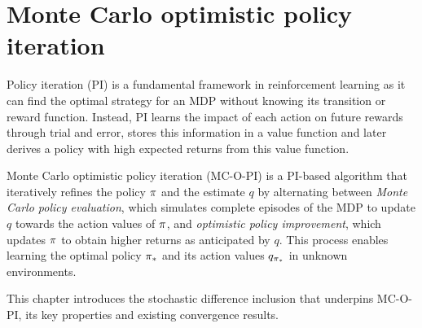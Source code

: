 
\chapter{Monte Carlo optimistic policy iteration}
\label{ch: mcopi}

\ifpdf
    \graphicspath{{Chapter2/Figs/Raster/}{Chapter2/Figs/PDF/}{Chapter2/Figs/}}
\else
    \graphicspath{{Chapter2/Figs/Vector/}{Chapter2/Figs/}}
\fi



\vfill



Policy iteration (PI) is a fundamental framework in reinforcement learning as it can find the optimal strategy for an MDP without knowing its transition or reward function.
Instead, PI 
learns the impact of each action on future rewards through trial and error,
stores this information in a value function
and later derives a policy with high expected returns from this value function.


Monte Carlo optimistic policy iteration (MC-O-PI) is a PI-based algorithm that iteratively refines the policy $\pi$ and the estimate $q$ by alternating between \textit{Monte Carlo policy evaluation}, which simulates complete episodes of the MDP to update $q$ towards the action values of $\pi$, 
and \textit{optimistic policy improvement}, which updates $\pi$ to obtain higher returns as anticipated by $q$.
This process enables learning the optimal policy ${\pi}_*$ and its action values $q_{{\pi}_*}$ in unknown environments.

This chapter introduces the stochastic difference inclusion that underpins MC-O-PI, its key properties and existing convergence results.




\newpage
